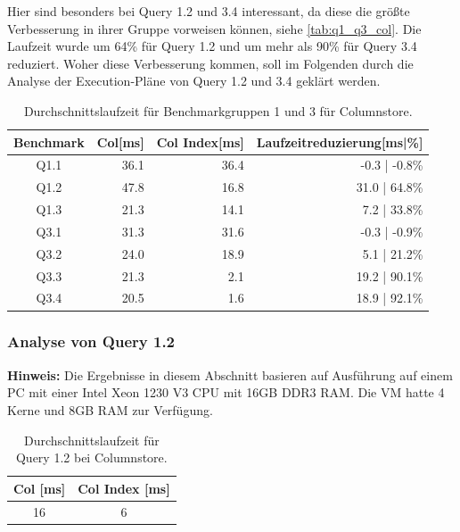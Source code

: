 Hier sind besonders bei Query 1.2 und 3.4 interessant, da diese die größte 
Verbesserung in ihrer Gruppe vorweisen können, siehe \autoref{tab:q1_q3_col}. 
Die Laufzeit wurde um 64\% für Query 1.2 und um mehr als 90\% für Query 3.4 
reduziert. Woher diese Verbesserung kommen, soll im Folgenden durch die Analyse 
der Execution-Pläne von Query 1.2 und 3.4 geklärt werden.

\begin{table}[H]
    \centering
    \begin{tabularx}{\linewidth}{crrr}
        \toprule
        Benchmark           & Col[ms]       & Col Index[ms] & Laufzeitreduzierung[ms|\%]   \\
        \toprule
        Q1.1                & 36.1          & 36.4          & -0.3 | -0.8\%                \\
        Q1.2                & 47.8          & 16.8          & 31.0 | 64.8\%                 \\
        Q1.3                & 21.3          & 14.1          & 7.2 | 33.8\%                \\
        \midrule
        Q3.1                & 31.3          & 31.6          & -0.3 | -0.9\%                \\
        Q3.2                & 24.0          & 18.9          & 5.1 | 21.2\%                 \\
        Q3.3                & 21.3          & 2.1           & 19.2 | 90.1\%                \\
        Q3.4                & 20.5          & 1.6           & 18.9 | 92.1\%                \\
        \bottomrule
    \end{tabularx}
\caption{Durchschnittslaufzeit für Benchmarkgruppen 1 und 3 für Columnstore.}
\label{tab:q1_q3_col}
\end{table}

\subsubsection{Analyse von Query 1.2}
\textbf{Hinweis:} Die Ergebnisse in diesem Abschnitt basieren auf Ausführung auf einem PC mit einer Intel Xeon 1230 V3 CPU mit 16GB DDR3 RAM. Die VM hatte 4 Kerne und 8GB RAM zur Verfügung.

\setlength\intextsep{0pt}
\begin{table}
    \centering
    \begin{tabular}{cc}
        Col [ms]       & Col Index [ms]    \\
        \toprule
         16          & 6         \\   
    \end{tabular}
	\caption{Durchschnittslaufzeit für Query 1.2 bei Columnstore.}
    \label{tab:olap_q12}
\end{table}

